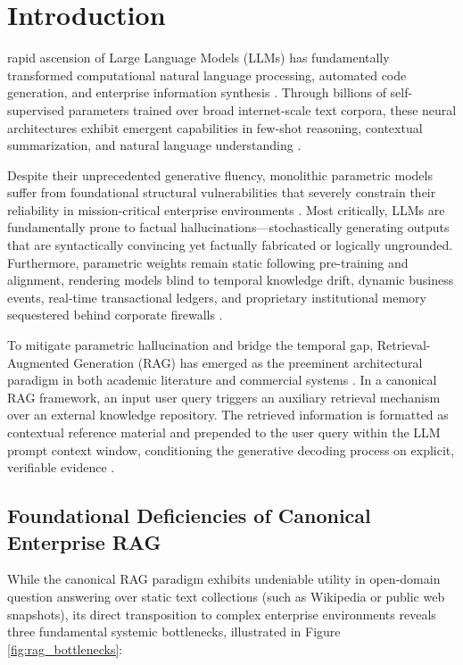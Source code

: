 \section{Introduction}
\label{sec:introduction}

 rapid ascension of Large Language Models (LLMs) has fundamentally transformed computational natural language processing, automated code generation, and enterprise information synthesis \cite{achiam2023gpt4,touvron2023llama,bai2023qwen}. Through billions of self-supervised parameters trained over broad internet-scale text corpora, these neural architectures exhibit emergent capabilities in few-shot reasoning, contextual summarization, and natural language understanding \cite{brown2020language,wei2022emergent}. 

Despite their unprecedented generative fluency, monolithic parametric models suffer from foundational structural vulnerabilities that severely constrain their reliability in mission-critical enterprise environments \cite{ji2023hallucination,huang2023survey}. Most critically, LLMs are fundamentally prone to factual hallucinations---stochastically generating outputs that are syntactically convincing yet factually fabricated or logically ungrounded. Furthermore, parametric weights remain static following pre-training and alignment, rendering models blind to temporal knowledge drift, dynamic business events, real-time transactional ledgers, and proprietary institutional memory sequestered behind corporate firewalls \cite{lewis2020rag,mialon2023augmented}.

To mitigate parametric hallucination and bridge the temporal gap, Retrieval-Augmented Generation (RAG) has emerged as the preeminent architectural paradigm in both academic literature and commercial systems \cite{lewis2020rag,guu2020realm,borgeaud2022retro}. In a canonical RAG framework, an input user query triggers an auxiliary retrieval mechanism over an external knowledge repository. The retrieved information is formatted as contextual reference material and prepended to the user query within the LLM prompt context window, conditioning the generative decoding process on explicit, verifiable evidence \cite{gao2023rag_survey}.

\subsection{Foundational Deficiencies of Canonical Enterprise RAG}
While the canonical RAG paradigm exhibits undeniable utility in open-domain question answering over static text collections (such as Wikipedia or public web snapshots), its direct transposition to complex enterprise environments reveals three fundamental systemic bottlenecks, illustrated in Figure \ref{fig:rag_bottlenecks}:

